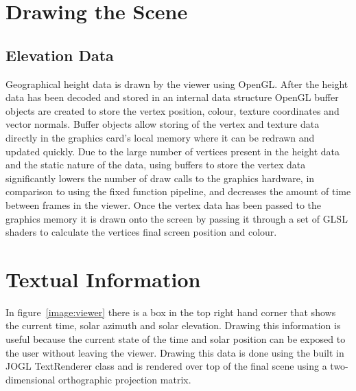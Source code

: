 \documentclass[12pt]{report}
\begin{document}
\section{Drawing the Scene}

\subsection{Elevation Data}
Geographical height data is drawn by the viewer using OpenGL. After the height data has been decoded and stored in an internal data structure OpenGL buffer objects are created to store the vertex position, colour, texture coordinates and vector normals. Buffer objects allow storing of the vertex and texture data directly in the graphics card's local memory where it can be redrawn and updated quickly. Due to the large number of vertices present in the height data and the static nature of the data, using buffers to store the vertex data significantly lowers the number of draw calls to the graphics hardware, in comparison to using the fixed function pipeline, and decreases the amount of time between frames in the viewer. Once the vertex data has been passed to the graphics memory it is drawn onto the screen by passing it through a set of GLSL shaders to calculate the vertices final screen position and colour.

\section{Textual Information}
In figure~\ref{image:viewer} there is a box in the top right hand corner that shows the current time, solar azimuth and solar elevation. Drawing this information is useful because the current state of the time and solar position can be exposed to the user without leaving the viewer. Drawing this data is done using the built in JOGL TextRenderer class and is rendered over top of the final scene using a two-dimensional orthographic projection matrix.
\end{document}
